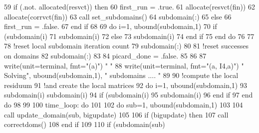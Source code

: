\begin{DoxyCode}
59         \textcolor{keywordflow}{if} (.not. \textcolor{keyword}{allocated}(resvct)) \textcolor{keywordflow}{then}
60           first\_run = .true.
61           \textcolor{keyword}{allocate}(resvct(fin))
62           \textcolor{keyword}{allocate}(corrvct(fin))          
63           \textcolor{keyword}{call }set_subdomains()
64           subdomain(:)%
65           \textcolor{keywordflow}{else}
66           first\_run = .false.
67 \textcolor{keywordflow}{        end if}
68 
69         \textcolor{keywordflow}{do} i=1, ubound(subdomain,1)
70           \textcolor{keywordflow}{if} (subdomain(i)%
71             subdomain(i)%
72           \textcolor{keywordflow}{else}
73             subdomain(i)%
74 \textcolor{keywordflow}{          end if}
75 \textcolor{keywordflow}{        end do}
76 
77                 
78         \textcolor{comment}{!reset local subdomain iteration count}
79         subdomain(:)%
80 
81         \textcolor{comment}{!reset successes on domains}
82         subdomain(:)%
83         
84         picard\_done = .false.
85         
86 
87         \textcolor{keyword}{write}(unit=terminal, fmt=\textcolor{stringliteral}{"(a)"}) \textcolor{stringliteral}{"  "}
88         \textcolor{keyword}{write}(unit=terminal, fmt=\textcolor{stringliteral}{"(a, I4,a)"}) \textcolor{stringliteral}{" Solving"}, ubound(subdomain,1),  \textcolor{stringliteral}{" subdomains .... "}
89         
90         \textcolor{comment}{!compute the local residuum}
91         \textcolor{comment}{!and create the local matrices}
92         \textcolor{keywordflow}{do} i=1, ubound(subdomain,1)
93           subdomain(i)%
      subdomain(i)%
94           \textcolor{keywordflow}{if} (subdomain(i)%
95             subdomain(i)%
96 \textcolor{keywordflow}{          end if}
97 \textcolor{keywordflow}{        end do}
98 
99         
100         time\_loop: \textcolor{keywordflow}{do}
101           
102           \textcolor{keywordflow}{do} sub=1, ubound(subdomain,1)
103             
104             \textcolor{keyword}{call }update\_domain(sub, bigupdate)
105             
106             \textcolor{keywordflow}{if} (bigupdate) \textcolor{keywordflow}{then}
107               \textcolor{keyword}{call }correctdoms()
108 \textcolor{keywordflow}{            end if}
109             
110             \textcolor{keywordflow}{if} (subdomain(sub)%

\end{DoxyCode}
